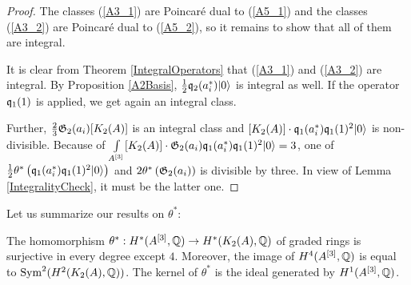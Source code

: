 \begin{proof}
The classes (\ref{A3_1}) are Poincar\'e dual to (\ref{A5_1}) and the classes (\ref{A3_2}) are Poincar\'e dual to (\ref{A5_2}), so it remains to show that all of them are integral.

It is clear from Theorem \ref{IntegralOperators} that (\ref{A3_1}) and (\ref{A3_2}) are integral. By Proposition \ref{A2Basis}, $\frac{1}{2}\q_2(a^*_i)\vac$ is integral as well. If the operator $ \q_1(1)$ is applied, we get again an integral class.

Further, $\frac{2}{3} \G_2(a_i)[\kum{A}{2}]$ is an integral class and $[\kum{A}{2}]\cdot\q_1(a^*_i)\q_1(1)^2\vac$ is non-divisible. 
Because of $\int\limits_{A\hilb{3}} [\kum{A}{2}]\cdot \G_2(a_i)  \q_1(a^*_i)\q_1(1)^2\vac = 3$, one of $\frac{1}{2}\theta^*\left( \q_1(a^*_i)\q_1(1)^2\vac \right)$ and $ 2\theta^*\left( \G_2(a_i) \right)$ is divisible by three. In view of Lemma \ref{IntegralityCheck}, it must be the latter one.
\end{proof}



Let us summarize our results on $\theta^*$:
\begin{theorem}\label{thetaTheorem}
The homomorphism $\theta^* : H^*(A\hilb{3},\Q)\rightarrow H^*(\kum{A}{2},\Q)$ of graded rings is surjective in every degree except $4$. Moreover, the image of $H^4(A\hilb{3},\Q)$ is equal to $\Sym^2(H^2(\kum{A}{2},\Q))$. 
The kernel of $\theta^*$ is the ideal generated by $H^1(A\hilb{3},\Q)$.
\end{theorem}